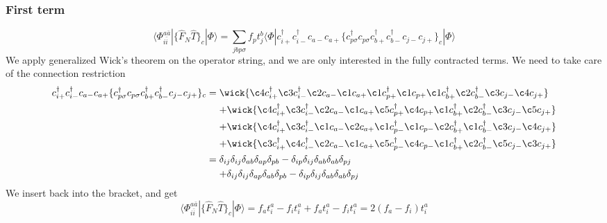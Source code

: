 \documentclass[norsk,a4paper,12pt]{article}
\begin{document}
\subsubsection*{First term}
\begin{equation*}
\langle\Phi_{i\bar{i}}^{a\bar{a}}|\{\hat{F}_N\hat{T}\}_c|\Phi\rangle=\sum_{jbp\sigma}f_pt_j^b\langle\Phi|c_{i+}^{\dagger}c_{i-}^{\dagger}c_{a-}c_{a+}\{c_{p\sigma}^{\dagger}c_{p\sigma}c_{b+}^{\dagger}c_{b-}^{\dagger}c_{j-}c_{j+}\}_c|\Phi\rangle
\end{equation*}
We apply generalized Wick's theorem on the operator string, and we are only interested in the fully contracted terms. We need to take care of the connection restriction
\begin{align*}
c_{i+}^{\dagger}c_{i-}^{\dagger}c_{a-}c_{a+}\{c_{p\sigma}^{\dagger}c_{p\sigma}c_{b+}^{\dagger}c_{b-}^{\dagger}c_{j-}c_{j+}\}_c
&=\wick{\c4 c_{i+}^{\dagger}\c3 c_{i-}^{\dagger}\c2 c_{a-}\c1 c_{a+}\c1 c_{p+}^{\dagger}\c1 c_{p+}\c1 c_{b+}^{\dagger}\c2 c_{b-}^{\dagger}\c3 c_{j-}\c4 c_{j+}}\notag\\
&\mathrel{\phantom{=}}+\wick{\c4 c_{i+}^{\dagger}\c3 c_{i-}^{\dagger}\c2 c_{a-}\c1 c_{a+}\c5 c_{p+}^{\dagger}\c4 c_{p+}\c1 c_{b+}^{\dagger}\c2 c_{b-}^{\dagger}\c3 c_{j-}\c5 c_{j+}}\notag\\
&\mathrel{\phantom{=}}+\wick{\c4 c_{i+}^{\dagger}\c3 c_{i-}^{\dagger}\c1 c_{a-}\c2 c_{a+}\c1 c_{p-}^{\dagger}\c1 c_{p-}\c2 c_{b+}^{\dagger}\c1 c_{b-}^{\dagger}\c3 c_{j-}\c4 c_{j+}}\notag\\
&\mathrel{\phantom{=}}+\wick{\c3 c_{i+}^{\dagger}\c4 c_{i-}^{\dagger}\c2 c_{a-}\c1 c_{a+}\c5 c_{p-}^{\dagger}\c4 c_{p-}\c1 c_{b+}^{\dagger}\c2 c_{b-}^{\dagger}\c5 c_{j-}\c3 c_{j+}}\notag\\
&=\delta_{ij}\delta_{ij}\delta_{ab}\delta_{ap}\delta_{pb}-\delta_{ip}\delta_{ij}\delta_{ab}\delta_{ab}\delta_{pj}\\
&\mathrel{\phantom{=}}+\delta_{ij}\delta_{ij}\delta_{ap}\delta_{ab}\delta_{pb}-\delta_{ip}\delta_{ij}\delta_{ab}\delta_{ab}\delta_{pj}
\end{align*}
We insert back into the bracket, and get
\begin{equation}
\langle\Phi_{i\bar{i}}^{a\bar{a}}|\{\hat{F}_N\hat{T}\}_c|\Phi\rangle=f_at_i^a-f_it_i^a+f_at_i^a-f_it_i^a=2(f_a-f_i)t_i^a
\end{equation}
\end{document}
